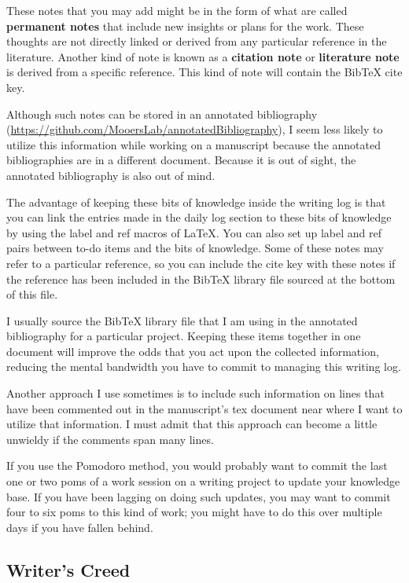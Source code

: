 \documentclass[11pt,letterpaper]{article}
\begin{document}
These notes that you may add might be in the form of what are called
\textbf{permanent notes} that include new insights or plans for the work. These
thoughts are not directly linked or derived from any particular
reference in the literature. Another kind of note is known as a
\textbf{citation note} or \textbf{literature note} is derived from a specific
reference. This kind of note will contain the BibTeX cite key.

Although such notes can be stored in an annotated bibliography
(\url{https://github.com/MooersLab/annotatedBibliography}), I seem less likely
to utilize this information while working on a manuscript because the
annotated bibliographies are in a different document. Because it is out
of sight, the annotated bibliography is also out of mind.

The advantage of keeping these bits of knowledge inside the writing log
is that you can link the entries made in the daily log section to these
bits of knowledge by using the label and ref macros of \LaTeX{}. You can
also set up label and ref pairs between to-do items and the bits of
knowledge. Some of these notes may refer to a particular reference, so
you can include the cite key with these notes if the reference has been
included in the BibTeX library file sourced at the bottom of this file.

I usually source the BibTeX library file that I am using in the
annotated bibliography for a particular project. Keeping these items
together in one document will improve the odds that you act upon the
collected information, reducing the mental bandwidth you have to commit
to managing this writing log.

Another approach I use sometimes is to include such information on lines
that have been commented out in the manuscript's tex document near where
I want to utilize that information. I must admit that this approach can
become a little unwieldy if the comments span many lines.

If you use the Pomodoro method, you would probably want to commit the
last one or two poms of a work session on a writing project to update
your knowledge base. If you have been lagging on doing such updates, you
may want to commit four to six poms to this kind of work; you might have
to do this over multiple days if you have fallen behind.




\subsection{Writer's Creed}
\label{sec:org7d1f302}
\end{document}
